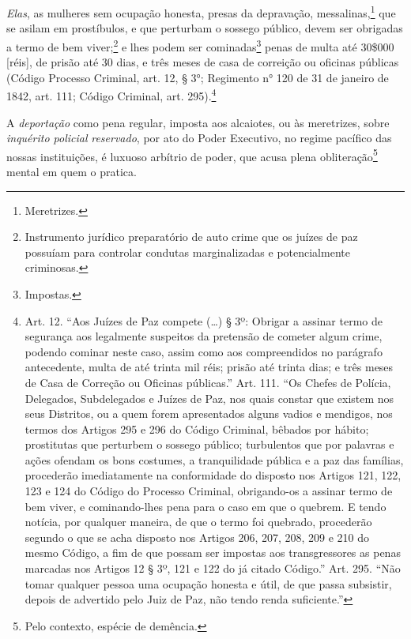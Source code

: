 \emph{Elas}, as mulheres sem ocupação honesta, presas da depravação,
messalinas,\footnote{Meretrizes.} que se asilam em prostíbulos, e que
perturbam o sossego público, devem ser obrigadas a termo de bem
viver;\footnote{Instrumento jurídico preparatório de auto crime que os
  juízes de paz possuíam para controlar condutas marginalizadas e
  potencialmente criminosas.} e lhes podem ser cominadas\footnote{
  Impostas.} penas de multa até 30\$000 {[}réis{]}, de prisão até 30 %
dias, e três meses de casa de correição ou oficinas públicas
(Código Processo Criminal, art. 12, § 3°;
Regimento n° 120 de 31 de janeiro de 1842, art. 111; Código
Criminal, art. 295).\footnote{Art. 12. ``Aos Juízes de Paz
  compete (\ldots{}) § 3º: Obrigar a assinar termo de segurança aos
  legalmente suspeitos da pretensão de cometer algum crime, podendo
  cominar neste caso, assim como aos compreendidos no parágrafo
  antecedente, multa de até trinta mil réis; prisão até trinta
  dias; e três meses de Casa de Correção ou Oficinas públicas.''
  Art. 111. ``Os Chefes de Polícia, Delegados, Subdelegados e Juízes de
  Paz, nos quais constar que existem nos seus Distritos, ou a quem forem
  apresentados alguns vadios e mendigos, nos termos dos Artigos 295 e
  296 do Código Criminal, bêbados por hábito; prostitutas que perturbem
  o sossego público; turbulentos que por palavras e ações ofendam os
  bons costumes, a tranquilidade pública e a paz das famílias,
  procederão imediatamente na conformidade do disposto nos Artigos 121,
  122, 123 e 124 do Código do Processo Criminal, obrigando-os a assinar
  termo de bem viver, e cominando-lhes pena para o caso em que o
  quebrem. E tendo notícia, por qualquer maneira, de que o termo foi
  quebrado, procederão segundo o que se acha disposto nos Artigos 206,
  207, 208, 209 e 210 do mesmo Código, a fim de que possam ser impostas
  aos transgressores as penas marcadas nos Artigos 12 § 3º, 121 e 122 do
  já citado Código.'' Art. 295. ``Não tomar qualquer pessoa uma ocupação
  honesta e útil, de que passa subsistir, depois de advertido pelo Juiz
  de Paz, não tendo renda suficiente.''}

A \emph{deportação} como pena regular, imposta aos alcaiotes, ou às
meretrizes, sobre \emph{inquérito policial} \emph{reservado}, por ato do
Poder Executivo, no regime pacífico das nossas instituições, é luxuoso
arbítrio de poder, que acusa plena obliteração\footnote{Pelo contexto,
  espécie de demência.} mental em quem o pratica.

